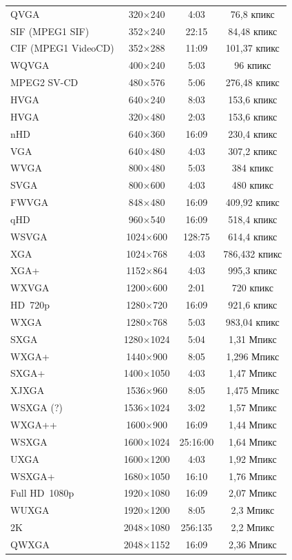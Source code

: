 \begin{VKRlongtable}
\begin{longtable}{|l|c|c|c|}
		QVGA & 320×240 & 4:03 & 76,8 кпикс\\ 
		SIF (MPEG1 SIF) & 352×240 & 22:15 & 84,48 кпикс\\
		CIF (MPEG1 VideoCD) & 352×288 & 11:09 & 101,37 кпикс\\
		WQVGA & 400×240 & 5:03 & 96 кпикс\\
		MPEG2 SV-CD & 480×576 & 5:06 & 276,48 кпикс\\
		HVGA & 640×240 & 8:03 & 153,6 кпикс\\
		HVGA & 320×480 & 2:03 & 153,6 кпикс\\
		nHD & 640×360 & 16:09 & 230,4 кпикс\\
		VGA & 640×480 & 4:03 & 307,2 кпикс\\
		WVGA & 800×480 & 5:03 & 384 кпикс\\
		SVGA & 800×600 & 4:03 & 480 кпикс\\
		FWVGA & 848×480 & 16:09 & 409,92 кпикс\\
		qHD & 960×540 & 16:09 & 518,4 кпикс\\
		WSVGA & 1024×600 & 128:75 & 614,4 кпикс\\
		XGA & 1024×768 & 4:03 & 786,432 кпикс\\
		XGA+ & 1152×864 & 4:03 & 995,3 кпикс\\
		WXVGA & 1200×600 & 2:01 & 720 кпикс\\
		HD 720p & 1280×720 & 16:09 & 921,6 кпикс\\
		WXGA & 1280×768 & 5:03 & 983,04 кпикс\\
		SXGA & 1280×1024 & 5:04 & 1,31 Мпикс\\
		WXGA+ & 1440×900 & 8:05 & 1,296 Мпикс\\
		SXGA+ & 1400×1050 & 4:03 & 1,47 Мпикс\\
		XJXGA & 1536×960 & 8:05 & 1,475 Мпикс\\
		WSXGA (?) & 1536×1024 & 3:02 & 1,57 Мпикс\\
		WXGA++ & 1600×900 & 16:09 & 1,44 Мпикс\\
		WSXGA & 1600×1024 & 25:16:00 & 1,64 Мпикс\\
		UXGA & 1600×1200 & 4:03 & 1,92 Мпикс\\
		WSXGA+ & 1680×1050 & 16:10 & 1,76 Мпикс\\
		Full HD 1080p & 1920×1080 & 16:09 & 2,07 Мпикс\\
		WUXGA & 1920×1200 & 8:05 & 2,3 Мпикс\\
		2K & 2048×1080 & 256:135 & 2,2 Мпикс\\
		QWXGA & 2048×1152 & 16:09 & 2,36 Мпикс\\

\end{longtable}
\end{VKRlongtable}
